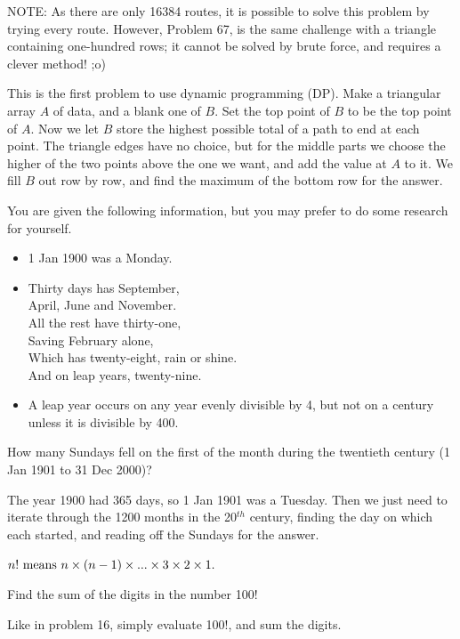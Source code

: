 \footnotesize
NOTE: As there are only 16384 routes, it is possible to solve this problem by trying every route. However, Problem 67, is the same challenge with a triangle containing one-hundred rows; it cannot be solved by brute force, and requires a clever method! ;o)

\normalsize

This is the first problem to use dynamic programming (DP).  Make a triangular array $A$ of data, and a blank one of $B$.
Set the top point of $B$ to be the top point of $A$.  Now we let $B$ store the highest possible total of a path to end at
each point.  The triangle edges have no choice, but for the middle parts we choose the higher of the two points above the one
we want, and add the value at $A$ to it.  We fill $B$ out row by row, and find the maximum of the bottom row for the answer.




You are given the following information, but you may prefer to do some research for yourself.
\begin{itemize}
\item 1 Jan 1900 was a Monday.
\item Thirty days has September,\\
      April, June and November.\\
      All the rest have thirty-one,\\
      Saving February alone,\\
      Which has twenty-eight, rain or shine.\\
      And on leap years, twenty-nine.
\item A leap year occurs on any year evenly divisible by 4, but not on a century unless it is divisible by 400.
\end{itemize}
How many Sundays fell on the first of the month during the twentieth century (1 Jan 1901 to 31 Dec 2000)?

The year 1900 had 365 days, so 1 Jan 1901 was a Tuesday.  Then we just need to iterate through the 1200 months
in the 20$^{th}$ century, finding the day on which each started, and reading off the Sundays for the answer.




$n!\hbox{ means }n \times (n - 1) \times ... \times 3 \times 2 \times 1.$

Find the sum of the digits in the number 100!

Like in problem 16, simply evaluate 100!, and sum the digits.

